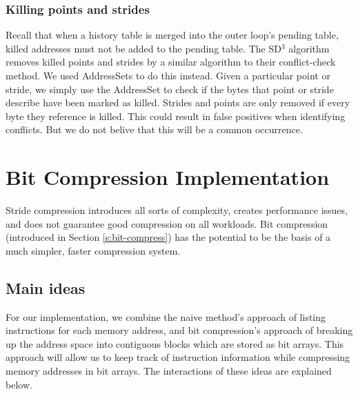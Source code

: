 \documentclass[12pt,twoside]{reedthesis}
\begin{document}
		\subsubsection{Killing points and strides}
		
			Recall that when a history table is merged into the outer loop's pending table, killed addresses must not be added to the pending table. 
			The SD$^3$ algorithm removes killed points and strides by a similar algorithm to their conflict-check method. We used AddressSets to do this instead. Given a particular point or stride, we simply use the AddressSet to check if the bytes that point or stride describe have been marked as killed. Strides and points are only removed if every byte they reference is killed. This could result in false positives when identifying conflicts. But we do not belive that this will be a common occurrence. %
%			
%			
		
					
		\section{Bit Compression Implementation}
			
			Stride compression introduces all sorts of complexity, creates performance issues, and does not guarantee good compression on all workloads. Bit compression (introduced in Section \ref{s:bit-compress}) has the potential to be the basis of a much simpler, faster compression system. %
			
			
			\subsection{Main ideas}
			
			For our implementation, we combine the naive method's approach of listing instructions for each memory address, and bit compression's approach of breaking up the address space into contiguous blocks which are stored as bit arrays. This approach will allow us to keep track of instruction information while compressing memory addresses in bit arrays. 
			The interactions of these ideas are explained below.
			
\end{document}
